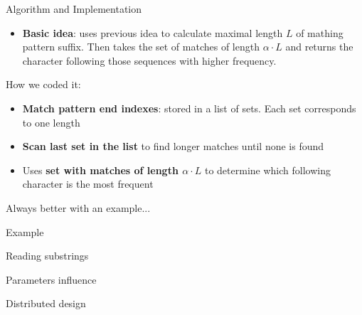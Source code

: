 \documentclass[aspectratio=169]{beamer}
\begin{document}
\begin{frame}{Algorithm and Implementation}
   \begin{itemize}
    \item \textbf{Basic idea}: uses previous idea to calculate maximal length $L$ of mathing pattern suffix. Then takes the set of matches of length $\alpha \cdot L$ and returns the character following those sequences with higher frequency.
  \end{itemize}

  \vspace{\fill}

  How we coded it:
  \begin{itemize}
    \item \textbf{Match pattern end indexes}: stored in a list of sets. Each set corresponds to one length
    \item \textbf{Scan last set in the list} to find longer matches until none is found
    \item Uses \textbf{set with matches of length $\alpha \cdot L$} to determine which following character is the most frequent
  \end{itemize}
  \vspace{\fill}

    Always better with an example...

\end{frame}

\begin{frame}{Example}\centering
  

\end{frame}


\begin{frame}{Reading substrings}\centering
  
\end{frame}


\begin{frame}{Parameters influence}
\end{frame}

\begin{frame}{Distributed design}
\end{frame}

\end{document}
